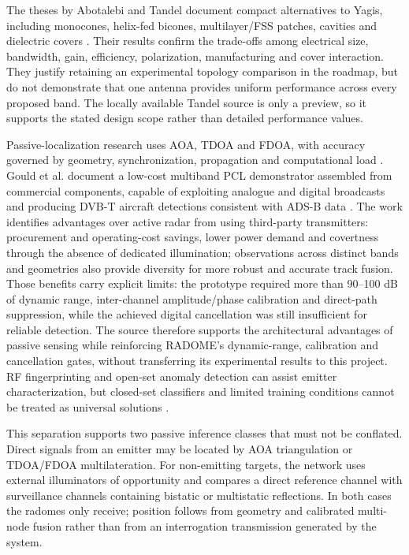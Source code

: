 The theses by Abotalebi and Tandel document compact alternatives to Yagis, including monocones, helix-fed bicones, multilayer/FSS patches, cavities and dielectric covers \cite{abotalebi2023,tandel2024}. Their results confirm the trade-offs among electrical size, bandwidth, gain, efficiency, polarization, manufacturing and cover interaction. They justify retaining an experimental topology comparison in the roadmap, but do not demonstrate that one antenna provides uniform performance across every proposed band. The locally available Tandel source is only a preview, so it supports the stated design scope rather than detailed performance values.

Passive-localization research uses AOA, TDOA and FDOA, with accuracy governed by geometry, synchronization, propagation and computational load \cite{liu2019,pine2021}. Gould et al. document a low-cost multiband PCL demonstrator assembled from commercial components, capable of exploiting analogue and digital broadcasts and producing DVB-T aircraft detections consistent with ADS-B data \cite{gould2006multiband}. The work identifies advantages over active radar from using third-party transmitters: procurement and operating-cost savings, lower power demand and covertness through the absence of dedicated illumination; observations across distinct bands and geometries also provide diversity for more robust and accurate track fusion. Those benefits carry explicit limits: the prototype required more than 90--100 dB of dynamic range, inter-channel amplitude/phase calibration and direct-path suppression, while the achieved digital cancellation was still insufficient for reliable detection. The source therefore supports the architectural advantages of passive sensing while reinforcing RADOME's dynamic-range, calibration and cancellation gates, without transferring its experimental results to this project. RF fingerprinting and open-set anomaly detection can assist emitter characterization, but closed-set classifiers and limited training conditions cannot be treated as universal solutions \cite{soltanieh2020,jagannath2022,sun2022}.

This separation supports two passive inference classes that must not be conflated. Direct signals from an emitter may be located by AOA triangulation or TDOA/FDOA multilateration. For non-emitting targets, the network uses external illuminators of opportunity and compares a direct reference channel with surveillance channels containing bistatic or multistatic reflections. In both cases the radomes only receive; position follows from geometry and calibrated multi-node fusion rather than from an interrogation transmission generated by the system.

